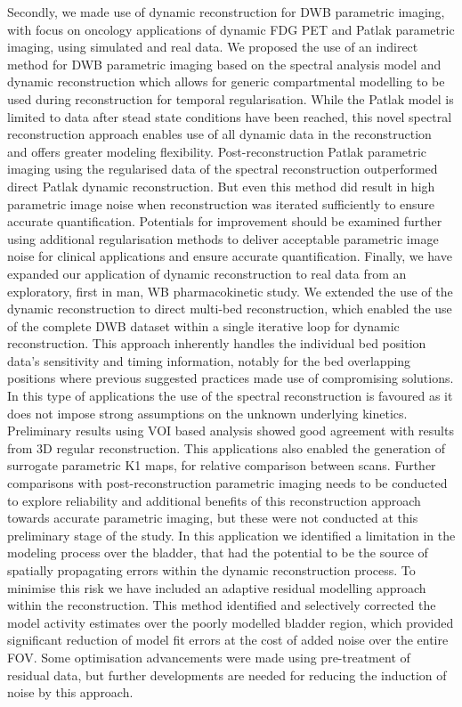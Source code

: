 Secondly, we made use of dynamic reconstruction for DWB parametric imaging, with focus on oncology applications of dynamic FDG PET and Patlak parametric imaging, using simulated and real data.
We proposed the use of an indirect method for DWB parametric imaging based on the spectral analysis model and dynamic reconstruction which allows for generic compartmental modelling to be used during reconstruction for temporal regularisation. While the Patlak model is limited to data after stead state conditions have been reached, this novel spectral reconstruction approach enables use of all dynamic data in the reconstruction and offers greater modeling flexibility. Post-reconstruction Patlak parametric imaging using the regularised data of the spectral reconstruction outperformed direct Patlak dynamic reconstruction. But even this method did result in high parametric image noise when reconstruction was iterated sufficiently to ensure accurate quantification. Potentials for improvement should be examined further using additional regularisation methods to deliver acceptable parametric image noise for clinical applications and ensure accurate quantification.
Finally, we have expanded our application of dynamic reconstruction to real data from an exploratory, first in man, WB pharmacokinetic study. We extended the use of the dynamic reconstruction to direct multi-bed reconstruction, which enabled the use of the complete DWB dataset within a single iterative loop for dynamic reconstruction. This approach inherently handles the individual bed position data's sensitivity and timing information, notably for the bed overlapping positions where previous suggested practices made use of compromising solutions. In this type of applications the use of the spectral reconstruction is favoured as it does not impose strong assumptions on the unknown underlying kinetics. Preliminary results using VOI based analysis showed good agreement with results from 3D regular reconstruction. This applications also enabled the generation of surrogate parametric K1 maps, for relative comparison between scans.
Further comparisons with post-reconstruction parametric imaging needs to be conducted to explore reliability and additional benefits of this reconstruction approach towards accurate parametric imaging, but these were not conducted at this preliminary stage of the study.
In this application we identified a limitation in the modeling process over the bladder, that had the potential to be the source of spatially propagating errors within the dynamic reconstruction process. 
To minimise this risk we have included an adaptive residual modelling approach within the reconstruction. This method identified and selectively corrected the model activity estimates over the poorly modelled bladder region, which provided significant reduction of model fit errors at the cost of added noise over the entire FOV. Some optimisation advancements were made using pre-treatment of residual data, but further developments are needed for reducing the induction of noise by this approach. 

